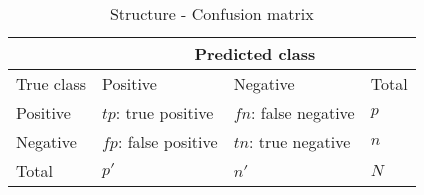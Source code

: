 \begin{table}[ht]
    \centering
    \begin{tabular}{ |l|l|l|l| }\hline
                    &   \multicolumn{3}{c|}{Predicted class}\\\hline
        True class  &  Positive             & Negative              & Total \\\hline
        Positive    & $tp$: true positive   & $fn$: false negative  & $p$   \\
        Negative    & $fp$: false positive  & $tn$: true negative   & $n$   \\\hline
        Total       & $p'$                  & $n'$                  & $N$   \\\hline
    \end{tabular}
    \caption{Structure - Confusion matrix}
    \label{tab:confmat}
\end{table}